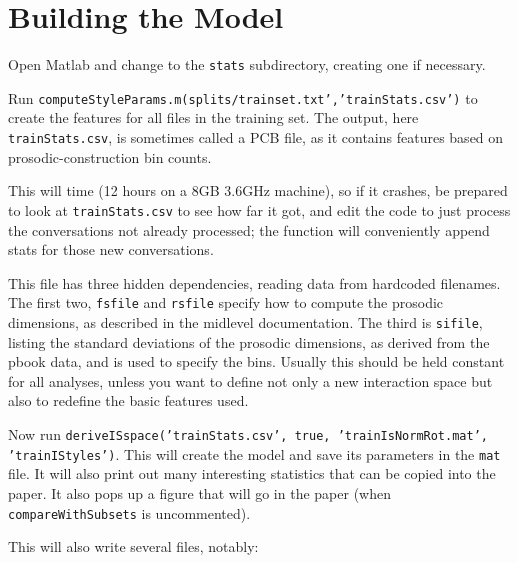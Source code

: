 \documentclass[11pt]{article}
\begin{document}
\section{Building the Model}

Open Matlab and change to the {\tt stats} subdirectory, creating one
if necessary.

Run {\tt computeStyleParams.m(splits/trainset.txt','trainStats.csv')}
to create the features for all files in the training set.  The output,
here {\tt trainStats.csv}, is sometimes called a PCB file, as it
contains features based on prosodic-construction bin counts.

This will time (12 hours on a 8GB 3.6GHz machine), so if it crashes,
be prepared to look at {\tt trainStats.csv} to see how far it got, and
edit the code to just process the conversations not already processed;
the function will conveniently append stats for those new
conversations.

This file has three hidden dependencies, reading data from hardcoded
filenames.  The first two, {\tt fsfile} and {\tt rsfile} specify how
to compute the prosodic dimensions, as described in the midlevel
documentation. The third is {\tt sifile}, listing the standard
deviations of the prosodic dimensions, as derived from the pbook data,
and is used to specify the bins. Usually this should be held constant
for all analyses, unless you want to define not only a new interaction
space but also to redefine the basic features used.

\medskip
Now run {\tt deriveISspace('trainStats.csv', true,
  'trainIsNormRot.mat', 'trainIStyles')}. This will create the model
and save its parameters in the {\tt mat} file. It will also print out
many interesting statistics that can be copied into the paper.  It
also pops up a figure that will go in the paper (when {\tt
  compareWithSubsets} is uncommented).

This will also write several files, notably:
\end{document}
